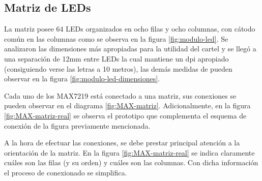 \subsection{Matriz de LEDs}
La matriz posee 64 LEDs organizados en ocho filas y ocho columnas, con cátodo común en las columnas como se observa en la figura \ref{fig:modulo-led}. Se analizaron las dimensiones más apropiadas para la utilidad del cartel y se llegó a una separación de 12mm entre LEDs la cual mantiene un dpi apropiado (consiguiendo verse las letras a 10 metros), las demás medidas de pueden observar en la figura \ref{fig:modulo-led-dimensiones}.

Cada uno de los MAX7219 está conectado a una matriz, sus conexiones se pueden observar en el diagrama \ref{fig:MAX-matriz}. Adicionalmente, en la figura \ref{fig:MAX-matriz-real} se observa el prototipo que complementa el esquema de conexión de la figura previamente mencionada.


A la hora de efectuar las conexiones, se debe prestar principal atención a la orientación de la matriz. En la figura \ref{fig:MAX-matriz-real} se indica claramente cuáles son las filas (y su orden) y cuáles son las columnas. Con dicha información el proceso de conexionado se simplifica.

